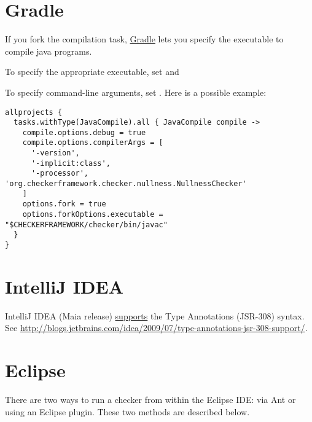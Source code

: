 \section{Gradle\label{gradle}}


If you fork the compilation task, \href{http://gradle.org/}{Gradle}
lets you specify the executable to compile java programs.

To specify the appropriate executable, set
 and

To specify command-line arguments, set
.  Here is a possible example:

\begin{Verbatim}
allprojects {
  tasks.withType(JavaCompile).all { JavaCompile compile ->
    compile.options.debug = true
    compile.options.compilerArgs = [
      '-version',
      '-implicit:class',
      '-processor', 'org.checkerframework.checker.nullness.NullnessChecker'
    ]
    options.fork = true
    options.forkOptions.executable = "$CHECKERFRAMEWORK/checker/bin/javac"
  }
}
\end{Verbatim}



\section{IntelliJ IDEA\label{intellij}}

IntelliJ IDEA (Maia release)
\href{http://blogs.jetbrains.com/idea/2009/07/type-annotations-jsr-308-support/}{supports}
the Type Annotations (JSR-308) syntax.
See \url{http://blogs.jetbrains.com/idea/2009/07/type-annotations-jsr-308-support/}.

\section{Eclipse\label{eclipse}}


There are two ways to run a checker from within the Eclipse IDE:  via Ant
or using an Eclipse plugin.  These two methods are described below.

